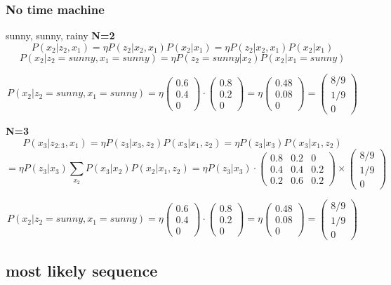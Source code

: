 \documentclass{article}
\begin{document}
\subsubsection{No time machine}
sunny, sunny, rainy
\textbf{N=2}
$$P(x_2|z_2, x_1) =  \eta P(z_2|x_2, x_1)P(x_2|x_1) = \eta P(z_2|x_2, x_1)P(x_2|x_1) $$
$$P(x_2|z_2=sunny, x_1=sunny) =\eta P(z_2=sunny|x_2)P(x_2|x_1=sunny) $$

$$P(x_2|z_2=sunny, x_1=sunny) =\eta \begin{pmatrix}
0.6 \\
 0.4 \\ 
 0
\end{pmatrix} \cdot \begin{pmatrix}
0.8 \\ 0.2 \\ 0
\end{pmatrix} = \eta \begin{pmatrix}
0.48 \\ 0.08 \\0
\end{pmatrix}  = \begin{pmatrix}
8/9 \\ 1/9 \\ 0
\end{pmatrix} $$

\textbf{N=3}
$$P(x_3|z_{2:3}, x_1) =  \eta P(z_3|x_3,z_2)P(x_3|x_1,z_2) = \eta P(z_3|x_3)P(x_3|x_1,z_2) $$
$$= \eta P(z_3|x_3) \sum_{x_2}P(x_3|x_2) P(x_2|x_1,z_2) =\eta P(z_3|x_3)\cdot
\begin{pmatrix}
0.8 & 0.2 & 0 \\
0.4 & 0.4 & 0.2 \\
0.2 & 0.6 & 0.2
\end{pmatrix} \times  \begin{pmatrix}
8/9 \\ 1/9 \\ 0
\end{pmatrix} $$


$$P(x_2|z_2=sunny, x_1=sunny) =\eta \begin{pmatrix}
0.6 \\
 0.4 \\ 
 0
\end{pmatrix} \cdot \begin{pmatrix}
0.8 \\ 0.2 \\ 0
\end{pmatrix} = \eta \begin{pmatrix}
0.48 \\ 0.08 \\0
\end{pmatrix}  = \begin{pmatrix}
8/9 \\ 1/9 \\ 0
\end{pmatrix} $$

\subsection{most likely sequence}
\end{document}

